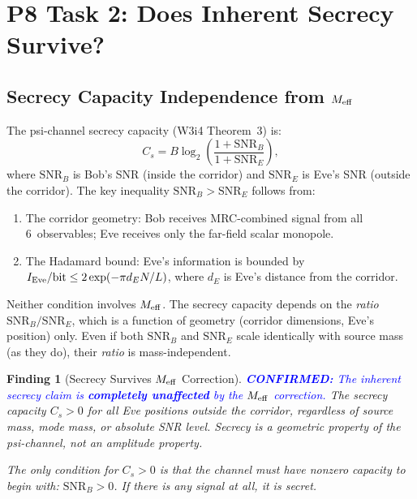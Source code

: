 \documentclass[aps,prd,twocolumn,superscriptaddress,nofootinbib]{revtex4-2}
\newcommand{\SNR}{\mathrm{SNR}}
\newcommand{\confirmed}[1]{\textcolor{blue}{\textbf{CONFIRMED:} #1}}
\newtheorem{finding}{Finding}
\begin{document}
\section{P8 Task 2: Does Inherent Secrecy Survive?}
\label{sec:secrecy}

\subsection{Secrecy Capacity Independence from $M_{\rm eff}$}

The psi-channel secrecy capacity (W3i4 Theorem~3) is:
\begin{equation}
C_s = B\log_2\!\left(\frac{1 + \SNR_B}{1 + \SNR_E}\right),
\label{eq:secrecy}
\end{equation}
where $\SNR_B$ is Bob's SNR (inside the corridor) and $\SNR_E$ is Eve's
SNR (outside the corridor). The key inequality $\SNR_B > \SNR_E$ follows
from:

\begin{enumerate}
\item The corridor geometry: Bob receives MRC-combined signal from all
  6~observables; Eve receives only the far-field scalar monopole.
\item The Hadamard bound: Eve's information is bounded by
  $I_{\rm Eve}/\text{bit} \leq 2\exp(-\pi d_E N / L)$, where $d_E$
  is Eve's distance from the corridor.
\end{enumerate}

Neither condition involves $M_{\rm eff}$. The secrecy capacity depends
on the \emph{ratio} $\SNR_B/\SNR_E$, which is a function of geometry
(corridor dimensions, Eve's position) only. Even if both $\SNR_B$ and
$\SNR_E$ scale identically with source mass (as they do), their
\emph{ratio} is mass-independent.

\begin{finding}[Secrecy Survives $M_{\rm eff}$ Correction]
\label{find:secrecy}
\confirmed{The inherent secrecy claim is \textbf{completely unaffected}
by the $M_{\rm eff}$ correction.} The secrecy capacity $C_s > 0$ for
all Eve positions outside the corridor, regardless of source mass,
mode mass, or absolute SNR level. Secrecy is a geometric property
of the psi-channel, not an amplitude property.

The only condition for $C_s > 0$ is that the channel must have
nonzero capacity to begin with: $\SNR_B > 0$. If there is any signal
at all, it is secret.
\end{finding}
\end{document}
